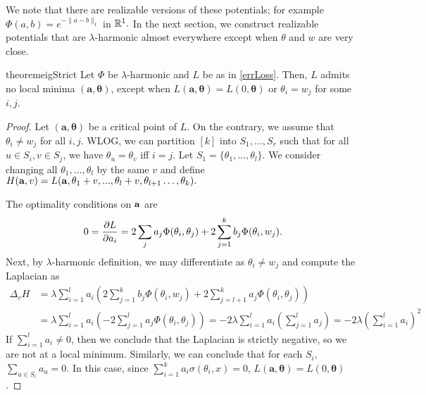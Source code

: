 We note that there are realizable versions of these potentials; for
example $\Phi(a,b) = e^{-\|a-b\|_1}$ in ${\mathbb{R}}^1.$
In the next section, we construct  realizable potentials that are 
$\lambda$-harmonic almost everywhere except when $\theta$ and $w$ are very close. 
%
\begin{restatable}{theorem}{eigStrict}
\label{EigStrict}
Let $\Phi$ be $\lambda$-harmonic and $L$ be as in \eqref{errLoss}. Then,
$L$ admits no local minima $\boldsymbol{(a,\theta)}$, except when
$L(\boldsymbol{a,\theta}) = L(0,\boldsymbol{\theta})$ or $\theta_i = w_j$ for some $i,j$. 
\end{restatable}
\begin{proof}
  Let $(\boldsymbol{a,\theta})$ be a critical point of $L.$ On the
  contrary, we assume that $\theta_i \neq w_j$ for all $i,j.$ WLOG, we
  can partition $[k]$ into $S_1,...,S_r$ such that for all $u \in S_i,
  v \in S_j$, we have $\theta_{u} = \theta_v$ iff $i=j$. 
%
Let $S_1 = \{ \theta_1, \ldots, \theta_{l}\}.$ 
We consider changing all
$\theta_1, \ldots, \theta_{l}$ by the same $v$ and define 
%
$H({\bf a}, v) = L({\bf a},\theta_1+v,...,\theta_l+v, \theta_{l+1}
\ldots, \theta_k).$

The optimality conditions on ${\bf a}$ are 
\begin{align*}
0 = \frac{\partial L}{\partial a_i} =  2\sum_{j} a_j \Phi(\theta_i,\theta_j)
  + 2\sum_{j=1}^k b_j \Phi(\theta_i,w_j).
\end{align*}
%
Next, by $\lambda$-harmonic definition, we may differentiate as $\theta_i \neq w_j$ and compute the Laplacian as 
\begin{align*}
\Delta_v H & = \lambda\sum_{i=1}^l a_i \left(2\sum_{j=1}^k b_j
  \Phi(\theta_i, w_j) + 2\sum_{j=l+1}^k a_j
  \Phi(\theta_i, \theta_j)\right) \\
& = \lambda\sum_{i=1}^l a_i \left( - 2
  \sum_{j = 1}^l  a_j \Phi(\theta_i,\theta_j)\right) 
%
%
 = -2\lambda\sum_{i=1}^l a_i \left( 
  \sum_{j = 1}^l  a_j \right) = -2 \lambda\left(\sum_{i=1}^l a_i\right)^2
\end{align*} 
%
If $\sum_{i=1}^l a_i \neq 0$, then we conclude that the Laplacian is
strictly negative, so we are not at a local minimum. 
%
Similarly, we can conclude that for each $S_i,$ 
 $\sum_{u \in S_i} a_u = 0$. In this case, since $\sum_{i=1}^k a_i \sigma(\theta_i,x) = 0$, $L(\boldsymbol{a,\theta}) = L(0,\boldsymbol{\theta})$. 
\end{proof} 
